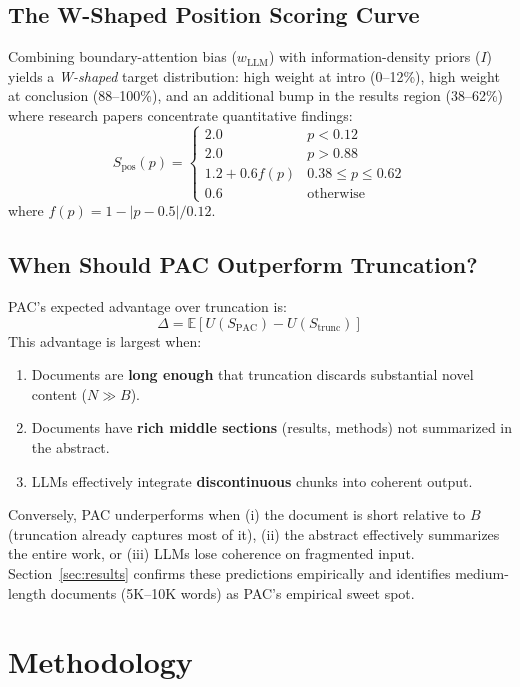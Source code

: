 \documentclass[journal]{IEEEtran}
\begin{document}
\subsection{The W-Shaped Position Scoring Curve}

Combining boundary-attention bias ($w_{\text{LLM}}$) with information-density priors ($I$) yields a \textit{W-shaped} target distribution: high weight at intro (0--12\%), high weight at conclusion (88--100\%), and an additional bump in the results region (38--62\%) where research papers concentrate quantitative findings:
\begin{equation}
S_{\text{pos}}(p) = \begin{cases}
2.0 & p < 0.12 \\
2.0 & p > 0.88 \\
1.2 + 0.6 f(p) & 0.38 \leq p \leq 0.62 \\
0.6 & \text{otherwise}
\end{cases}
\label{eq:wcurve}
\end{equation}
where $f(p) = 1 - |p - 0.5|/0.12$.

\subsection{When Should PAC Outperform Truncation?}

PAC's expected advantage over truncation is:
\begin{equation}
\Delta = \mathbb{E}\!\left[U(S_{\text{PAC}}) - U(S_{\text{trunc}})\right]
\end{equation}
This advantage is largest when:
\begin{enumerate}
\item Documents are \textbf{long enough} that truncation discards substantial novel content ($N \gg B$).
\item Documents have \textbf{rich middle sections} (results, methods) not summarized in the abstract.
\item LLMs effectively integrate \textbf{discontinuous} chunks into coherent output.
\end{enumerate}
Conversely, PAC underperforms when (i) the document is short relative to $B$ (truncation already captures most of it), (ii) the abstract effectively summarizes the entire work, or (iii) LLMs lose coherence on fragmented input. Section~\ref{sec:results} confirms these predictions empirically and identifies medium-length documents (5K--10K words) as PAC's empirical sweet spot.

\section{Methodology}
\end{document}
